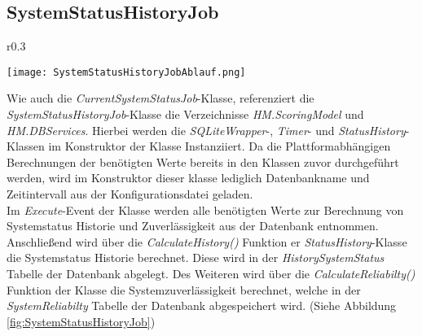 \subsection{SystemStatusHistoryJob}
\begin{wrapfigure}{r}{0.3\textwidth}
  \captionsetup{justification=centering,format=plain, font=small}
    \vspace{-1.2cm}
    \begin{center}
      \texttt{[image: SystemStatusHistoryJobAblauf.png]}
    \end{center}
    \vspace{-0.5cm}
    \caption{Ablaufdiagram des Execute Events der \textit{SystemStatusHistoryJob}-Klasse}
    \label{fig:SystemStatusHistoryJob}
  \end{wrapfigure}
Wie auch die \textit{CurrentSystemStatusJob}-Klasse, referenziert die \textit{SystemStatusHistoryJob}-Klasse die Verzeichnisse \textit{HM.ScoringModel} und \textit{HM.DBServices}. Hierbei werden die \textit{SQLiteWrapper}-, \textit{Timer}- und \textit{StatusHistory}-Klassen im Konstruktor der Klasse Instanziiert. Da die Plattformabhängigen Berechnungen der benötigten Werte bereits in den Klassen zuvor durchgeführt werden, wird im Konstruktor dieser klasse lediglich Datenbankname und Zeitintervall aus der Konfigurationsdatei geladen.\\
Im \textit{Execute}-Event der Klasse werden alle benötigten Werte zur Berechnung von Systemstatus Historie und Zuverlässigkeit aus der Datenbank entnommen. Anschließend wird über die \textit{CalculateHistory()} Funktion er \textit{StatusHistory}-Klasse die Systemstatus Historie berechnet. Diese wird in der \textit{HistorySystemStatus} Tabelle der Datenbank abgelegt. Des Weiteren wird über die \textit{CalculateReliabilty()} Funktion der Klasse die Systemzuverlässigkeit berechnet, welche in der \textit{SystemReliabilty} Tabelle der Datenbank abgespeichert wird. (Siehe Abbildung \ref{fig:SystemStatusHistoryJob})
  